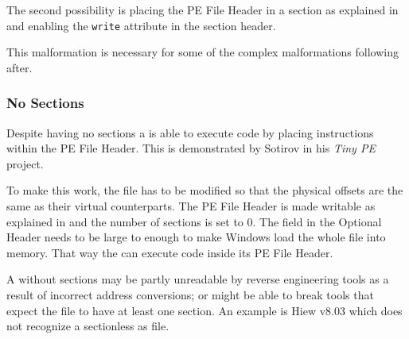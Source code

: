The second possibility is placing the PE File Header in a section as explained in \emph{} and enabling the \texttt{write} attribute in the section header.

This malformation is necessary for some of the complex malformations following after.

\subsubsection*{No Sections}

Despite having no sections a \PE{} is able to execute code by placing instructions within the PE File Header. This is demonstrated by Sotirov in his \emph{Tiny PE} project. \cite{tinype}

To make this work, the file has to be modified so that the physical offsets are the same as their virtual counterparts. The PE File Header is made writable as explained in \emph{} and the number of sections is set to 0. The  field in the Optional Header needs to be large to enough to make Windows load the whole file into memory. That way the \PE{} can execute code inside its PE File Header.

A \PE{} without sections may be partly unreadable by reverse engineering tools as a result of incorrect address conversions; or might be able to break tools that expect the file to have at least one section. An example is Hiew v8.03 which does not recognize a sectionless \PE{} as \PE{} file.
